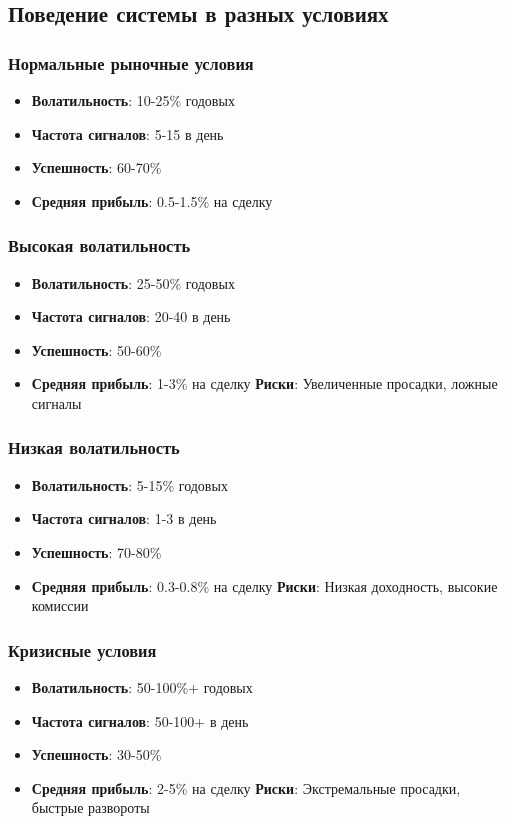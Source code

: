 \documentclass[12pt,a4paper]{article}
\begin{document}
\subsection{Поведение системы в разных условиях}

\subsubsection{Нормальные рыночные условия}
\begin{itemize}
    \item \textbf{Волатильность}: 10-25\% годовых
    \item \textbf{Частота сигналов}: 5-15 в день
    \item \textbf{Успешность}: 60-70\%
    \item \textbf{Средняя прибыль}: 0.5-1.5\% на сделку
\end{itemize}

\subsubsection{Высокая волатильность}
\begin{itemize}
    \item \textbf{Волатильность}: 25-50\% годовых
    \item \textbf{Частота сигналов}: 20-40 в день
    \item \textbf{Успешность}: 50-60\%
    \item \textbf{Средняя прибыль}: 1-3\% на сделку
    \textbf{Риски}: Увеличенные просадки, ложные сигналы
\end{itemize}

\subsubsection{Низкая волатильность}
\begin{itemize}
    \item \textbf{Волатильность}: 5-15\% годовых
    \item \textbf{Частота сигналов}: 1-3 в день
    \item \textbf{Успешность}: 70-80\%
    \item \textbf{Средняя прибыль}: 0.3-0.8\% на сделку
    \textbf{Риски}: Низкая доходность, высокие комиссии
\end{itemize}

\subsubsection{Кризисные условия}
\begin{itemize}
    \item \textbf{Волатильность}: 50-100\%+ годовых
    \item \textbf{Частота сигналов}: 50-100+ в день
    \item \textbf{Успешность}: 30-50\%
    \item \textbf{Средняя прибыль}: 2-5\% на сделку
    \textbf{Риски}: Экстремальные просадки, быстрые развороты
\end{itemize}
\end{document}
